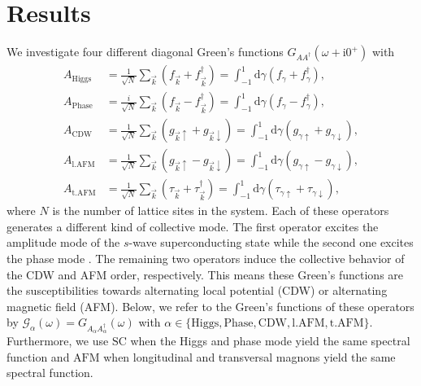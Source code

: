 \documentclass[
    reprint, 
    aps,
    preprintnumbers,
    twocolumn,
    prb,
    superscriptaddress
]{revtex4-2}
\newcommand{\vk}{\vec{k}}
\newcommand{\up}{\uparrow}
\newcommand{\down}{\downarrow}
\newcommand{\im}{\mathrm{i}}
\newcommand{\dgamma}{\mathrm{d}\gamma}
\begin{document}
\section{Results}
\label{sec:results}


We investigate four different diagonal Green's functions $G_{AA^\dagger}(\omega + \im 0^+)$ with
\begin{subequations}
    \label{eqn:resolvent_bases}
    \begin{align}
        A_\text{Higgs} &= \frac{1}{\sqrt{N}} \sum_{\vk} \left( f_{\vk} + f_{\vk}^\dagger \right)  
            = \int_{-1}^1 \dgamma \left( f_{\gamma} + f_{\gamma}^\dagger \right) ,\\
        A_\text{Phase} &= \frac{i}{\sqrt{N}} \sum_{\vk} \left( f_{\vk} - f_{\vk}^\dagger \right) = 
				\int_{-1}^1 \dgamma \left( f_{\gamma} - f_{\gamma}^\dagger \right) ,\\
        A_\text{CDW}   &= \frac{1}{\sqrt{N}} \sum_{\vk} \left( g_{\vk \up} + g_{\vk \down} \right) = 
				\int_{-1}^1 \dgamma \left( g_{\gamma \up} + g_{\gamma \down} \right) ,\\
        A_\text{l.AFM}   &= \frac{1}{\sqrt{N}} \sum_{\vk} \left( g_{\vk \up} - g_{\vk \down} \right) = 
				\int_{-1}^1 \dgamma \left( g_{\gamma \up} - g_{\gamma \down} \right) , \\
        A_\text{t.AFM}   &= \frac{1}{\sqrt{N}} \sum_{\vk} \left( \tau_{\vk} + \tau_{\vk}^\dagger \right) = 
				\int_{-1}^1 \dgamma \left( \tau_{\gamma \up} + \tau_{\gamma \down} \right) ,
    \end{align}
\end{subequations}
where $N$ is the number of lattice sites in the system. 
Each of these operators generates a different kind of collective mode.
The first operator excites the amplitude mode of the $s$-wave superconducting state
while the second one excites the phase mode \cite{Fan22}.
The remaining two operators induce the collective behavior of the CDW and AFM order, respectively.
This means these Green's functions are the susceptibilities towards alternating local potential (CDW) or
alternating magnetic field (AFM).
Below, we refer to the Green's functions of these operators by
$\mathcal{G}_{\alpha}(\omega) = G_{A_\alpha A_\alpha^\dagger}(\omega)$ 
with $\alpha \in \{ \text{Higgs}, \text{Phase}, \text{CDW}, \text{l.AFM}, \text{t.AFM} \}$.
Furthermore, we use $\text{SC}$ when the Higgs and phase mode yield the same spectral function and
$\text{AFM}$ when longitudinal and transversal magnons yield the same spectral function.
\end{document}
